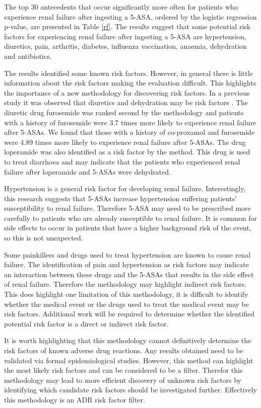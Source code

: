 \documentclass{llncs}
\begin{document}
The top 30 antecedents that occur significantly more often for patients who experience renal failure after ingesting a 5-ASA, ordered by the logistic regression p-value, are presented in Table \ref{rf}. The results suggest that some potential risk factors for experiencing renal failure after ingesting a 5-ASA are hypertension, diuretics, pain, arthritis, diabetes, influenza vaccination, anaemia, dehydration and antibiotics. 

The results identified some known risk factors. However, in general there is little information about the risk factors making the evaluation difficult. This highlights the importance of a new methodology for discovering risk factors. In a previous study it was observed that diuretics and dehydration may be risk factors \cite{de20055}. The diuretic drug furosemide was ranked second by the methodology and patients with a history of furosemide were 3.7 times more likely to experience renal failure after 5-ASAs. We found that those with a history of co-proxamol and furosemide were 4.89 times more likely to experience renal failure after 5-ASAs. The drug loperamide was also identified as a risk factor by the method. This drug is used to treat diarrhoea and may indicate that the patients who experienced renal failure after loperamide and 5-ASAs were dehydrated.

Hypertension is a general risk factor for developing renal failure. Interestingly, this research suggests that 5-ASAs increase hypertension suffering patients' susceptibility to renal failure. Therefore 5-ASA may need to be prescribed more carefully to patients who are already susceptible to renal failure. It is common for side effects to occur in patients that have a higher background risk of the event, so this is not unexpected.

Some painkillers and drugs used to treat hypertension are known to cause renal failure. The identification of pain and hypertension as risk factors may indicate an interaction between these drugs and the 5-ASAs that results in the side effect of renal failure. Therefore the methodology may highlight indirect risk factors. This does highlight one limitation of this methodology, it is difficult to identify whether the medical event or the drugs used to treat the medical event may be risk factors. Additional work will be required to determine whether the identified potential risk factor is a direct or indirect risk factor.

It is worth highlighting that this methodology cannot definitively determine the risk factors of known adverse drug reactions. Any results obtained need to be validated via formal epidemiological studies. However, this method can highlight the most likely risk factors and can be considered to be a filter. Therefor this methodology may lead to more efficient discovery of unknown risk factors by identifying which candidate risk factors should be investigated further. Effectively this methodology is an ADR risk factor filter.
\end{document}
